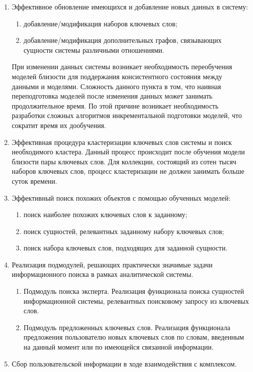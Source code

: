 \begin{enumerate}
    \item Эффективное обновление имеющихся и добавление новых данных в систему:
    \begin{enumerate}
        \item добавление/модификация наборов ключевых слов;
        \item добавление/модификация дополнительных графов, связывающих сущности системы различными отношениями.
    \end{enumerate}
    При изменении данных системы возникает необходимость переобучения моделей близости для поддержания консистентного состояния между данными и моделями. Сложность данного пункта в том, что наивная переподготовка моделей после изменения данных может занимать продолжительное время. По этой причине возникает необходимость разработки сложных алгоритмов инкрементальной подготовки моделей, что сократит время их дообучения.
    \item Эффективная процедура кластеризации ключевых слов системы и поиск необходимого кластера. Данный процесс происходит после обучения модели близости пары ключевых слов. Для коллекции, состоящий из сотен тысяч наборов ключевых слов, процесс кластеризации не должен занимать больше суток времени.
    \item Эффективный поиск похожих объектов с помощью обученных моделей:
    \begin{enumerate}
        \item поиск наиболее похожих ключевых слов к заданному;
        \item поиск сущностей, релевантных заданному набору ключевых слов;
        \item поиск набора ключевых слов, подходящих для заданной сущности.
    \end{enumerate}
    \item Реализация подмодулей, решающих практически значимые задачи информационного поиска в рамках аналитической системы.
    \begin{enumerate}
        \item Подмодуль поиска эксперта. Реализация функционала поиска сущностей информационной системы, релевантных поисковому запросу из ключевых слов.
        \item Подмодуль предложенных ключевых слов. Реализация функционала предложения пользователю новых ключевых слов по словам, введенным на данный момент или по имеющейся связанной информации.
    \end{enumerate}
    \item Сбор пользовательской информации в ходе взаимодействия с комплексом.

\end{enumerate}
